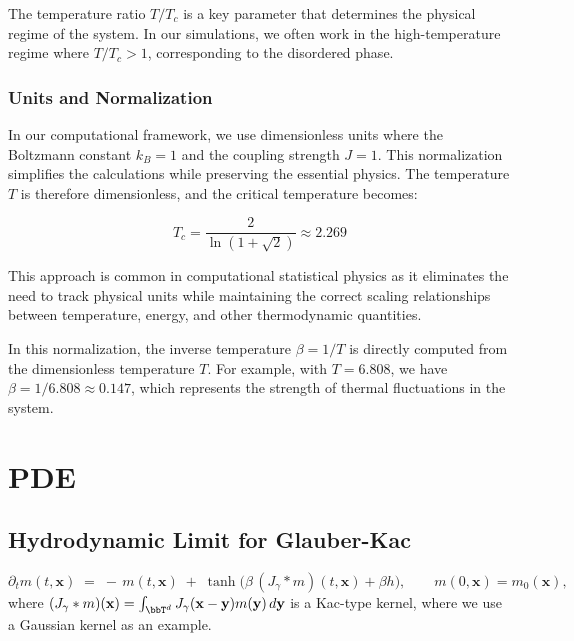 \documentclass[11pt,a4paper]{article}
\begin{document}
The temperature ratio $T/T_c$ is a key parameter that determines the physical regime of the system. In our simulations, we often work in the high-temperature regime where $T/T_c > 1$, corresponding to the disordered phase.

\subsubsection{Units and Normalization}

In our computational framework, we use dimensionless units where the Boltzmann constant $k_B = 1$ and the coupling strength $J = 1$. This normalization simplifies the calculations while preserving the essential physics. The temperature $T$ is therefore dimensionless, and the critical temperature becomes:

\begin{equation}
T_c = \frac{2}{\ln(1 + \sqrt{2})} \approx 2.269
\end{equation}

This approach is common in computational statistical physics as it eliminates the need to track physical units while maintaining the correct scaling relationships between temperature, energy, and other thermodynamic quantities.

In this normalization, the inverse temperature $\beta = 1/T$ is directly computed from the dimensionless temperature $T$. For example, with $T = 6.808$, we have $\beta = 1/6.808 \approx 0.147$, which represents the strength of thermal fluctuations in the system.

\section{PDE}

\subsection{Hydrodynamic Limit for Glauber-Kac}

\begin{equation}\label{eq:nonlocal}
    \partial_t m(t,\mathbf{x}) \;=\; -\,m(t,\mathbf{x})\;+\;\tanh\!\Big(\beta\, (J_\gamma * m)(t,\mathbf{x}) + \beta h\Big), \qquad m(0,\mathbf{x})=m_0(\mathbf{x}),
    \end{equation}
where $(J_\gamma * m)(\mathbf{x})=\int_{\bbT^d}J_\gamma(\mathbf{x}-\mathbf{y})m(\mathbf{y})\,d\mathbf{y}$ is a Kac-type kernel, where we use a Gaussian kernel as an example.  
\end{document}
